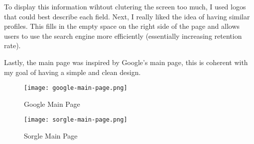 To display this information wihtout clutering the screen too much, I used logos that could best describe each field. Next, I really liked the idea of having similar profiles. This fills in the empty space on the right side of the page and allows users to use the search engine more efficiently (essentially increasing retention rate).

Lastly, the main page was inspired by Google's main page, this is coherent with my goal of having a simple and clean design.

\begin{figure}[h]
	\centering
	\begin{minipage}{0.48\textwidth}
		\centering
		\texttt{[image: google-main-page.png]}
		\caption{Google Main Page}
		\label{fig:google_main_page}
	\end{minipage}\hfill
	\begin{minipage}{0.48\textwidth}
		\centering
		\texttt{[image: sorgle-main-page.png]}
		\caption{Sorgle Main Page}
		\label{fig:sorgle_main_page}
	\end{minipage}
\end{figure}